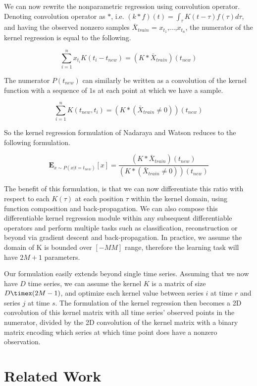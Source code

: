 \documentclass{article} %
\begin{document}
We can now rewrite the nonparametric regression using convolution operator. Denoting convolution operator as $\ast$, i.e. $(k \ast f)(t) = \int_\tau K(t-\tau) f(\tau) d\tau$, and having the observed nonzero samples $\bar X_{train}$ = {$x_{t_1}$,...,$x_{t_n}$}, the numerator of the kernel regression is equal to the following.

$$ \sum_{i=1}^n{x_{t_{i}}K(t_{i} - t_{new})} = (K \ast \bar X_{train}) (t_{new})$$

The numerator $P(t_{new})$ can similarly be written as a convolution of the kernel function with a sequence of $1$s at each point at which we have a sample. 

$$ \sum_{i=1}^n{K(t_{new}, t_{i})} = (K \ast (\bar X_{train} \neq 0)) (t_{new}) $$

So the kernel regression formulation of Nadaraya and Watson reduces to the following formulation.

$$ \mathbf{E}_{x \sim P(x|t=t_{new})}[x] = \frac{(K \ast \bar X_{train}) (t_{new})}{(K \ast (\bar X_{train} \neq 0)) (t_{new})} $$

The benefit of this formulation, is that we can now differentiate this ratio with respect to each $K(\tau)$ at each position $\tau$ within the kernel domain, using function composition and back-propagation\cite{}. We can also compose this differentiable kernel regression module within any subsequent differentiable operators and perform multiple tasks such as classification, reconstruction or beyond via gradient descent and back-propagation. In practice, we assume the domain of K is bounded over $[-M M]$ range, therefore the learning task will have $2M+1$ parameters.

Our formulation easily extends beyond single time series. Assuming that we now have $D$ time series, we can assume the kernel $K$ is a matrix of size $D \timex (2M-1)$, and optimize each kernel value between series $i$ at time $r$ and series $j$ at time $s$. The formulation of the kernel regression then becomes a 2D convolution of this kernel matrix with all time series' observed points in the numerator, divided by the 2D convolution of the kernel matrix with a binary matrix encoding which series at which time point does have a nonzero observation.

\section{Related Work}


\end{document}
